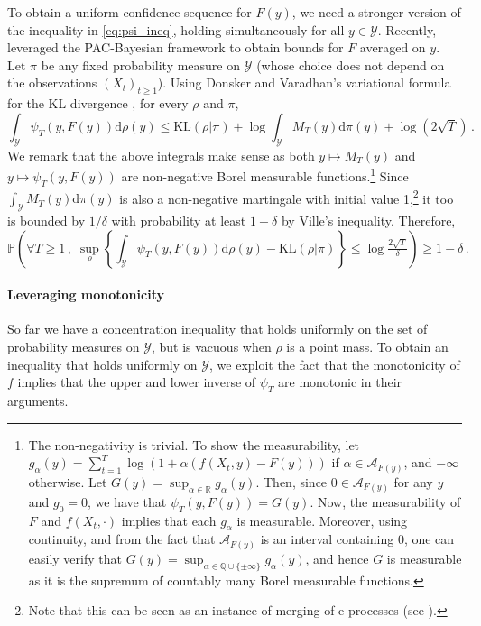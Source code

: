 \documentclass[3p, authoryear, 10pt]{elsarticle}%
\newcommand{\A}{\mathcal A}
\newcommand{\dd}{\mathrm d}
\newcommand{\KL}{\mathrm{KL}}
\newcommand{\R}{\mathbb R}
\newcommand{\Y}{\mathcal Y}
\begin{document}
To obtain a uniform confidence sequence for $F(y)$, we need a stronger version of the inequality in \eqref{eq:psi_ineq}, holding simultaneously for all $y \in \Y$. Recently, \citet{jang2023tighter} leveraged the PAC-Bayesian framework \citep{alquier2024user} to obtain bounds for $F$ averaged on $y$. Let $\pi$ be any fixed probability measure on $\Y$ (whose choice does not depend on the observations $(X_t)_{t\geq 1}$). Using Donsker and Varadhan's variational formula for the KL divergence \citep{donsker1976asymptotic}, for every $\rho$ and $\pi$,
\begin{equation}\label{eq:bound}
    \int_{\Y}\psi_T(y, F(y))\dd\rho(y) \leq \KL(\rho|\pi) + \log\int_\Y M_T(y)\dd\pi(y) +\log(2\sqrt T)\,.
\end{equation}
We remark that the above integrals make sense as both $y\mapsto M_T(y)$ and $y\mapsto\psi_T(y,F(y))$ are non-negative Borel measurable functions.\footnote{The non-negativity is trivial. To show the measurability, let $g_\alpha(y) = \sum_{t=1}^{T}\log(1+\alpha(f(X_t,y)-F(y)))$ if $\alpha\in\A_{F(y)}$, and $-\infty$ otherwise. Let $G(y) = \sup_{\alpha\in\R}g_\alpha(y)$. Then, since $0\in\A_{F(y)}$ for any $y$ and $g_0=0$, we have that $\psi_T(y,F(y)) = G(y)$. Now, the measurability of $F$ and $f(X_t,\cdot)$ implies that each $g_\alpha$ is measurable. Moreover, using continuity, and from the fact that $\A_{F(y)}$ is an interval containing $0$, one can easily verify that $G(y)= \sup_{\alpha\in\mathbb Q\cup\{\pm\infty\}}g_\alpha(y)$, and hence $G$ is measurable as it is the supremum of countably many Borel measurable functions.} Since $\int_{\Y}M_T(y)\dd \pi(y)$ is also a non-negative martingale with initial value 1,\footnote{Note that this can be seen as an instance of merging of e-processes (see \citealp{vovk2021evalues, ramdas2024hypothesis}).} it too is bounded by $1/\delta$ with probability at least $1 - \delta$ by Ville's inequality. Therefore,
\begin{equation*}
\mathbb{P}\left(\forall T \geq 1\,, \;\sup_{\rho}\left\{\int_{\Y}\psi_T(y, F(y))\dd\rho(y) - \KL(\rho|\pi)\right\} \leq \log\tfrac{2\sqrt{T}}{\delta}\right) \geq 1 - \delta\,.
\end{equation*}



\paragraph{Leveraging monotonicity} 
So far we have a concentration inequality that holds uniformly on the set of probability measures on $\Y$, but is vacuous when $\rho$ is a point mass. To obtain an inequality that holds uniformly on $\Y$, we exploit the fact that the monotonicity of $f$ implies that the upper and lower inverse of $\psi_T$ are monotonic in their arguments.
\end{document}
